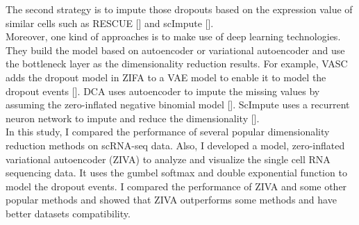 The second strategy is to impute those dropouts based on the expression value of similar cells such as RESCUE [] and scImpute []. \\
Moreover, one kind of approaches is to make use of deep learning technologies. They build the model based on autoencoder or variational autoencoder and use the bottleneck layer as the dimensionality reduction results. For example, VASC adds the dropout model in ZIFA to a VAE model to enable it to model the dropout events [].  DCA uses autoencoder to impute the missing values by assuming the zero-inflated negative binomial model []. ScImpute uses a recurrent neuron network to impute and reduce the dimensionality []. \\
In this study, I compared the performance of several popular dimensionality reduction methods on scRNA-seq data. Also, I developed a model, zero-inflated variational autoencoder (ZIVA) to analyze and visualize the single cell RNA sequencing data. It uses the gumbel softmax and double exponential function to model the dropout events. I compared the performance of ZIVA and some other popular methods and showed that ZIVA outperforms some methods and have better datasets compatibility.

